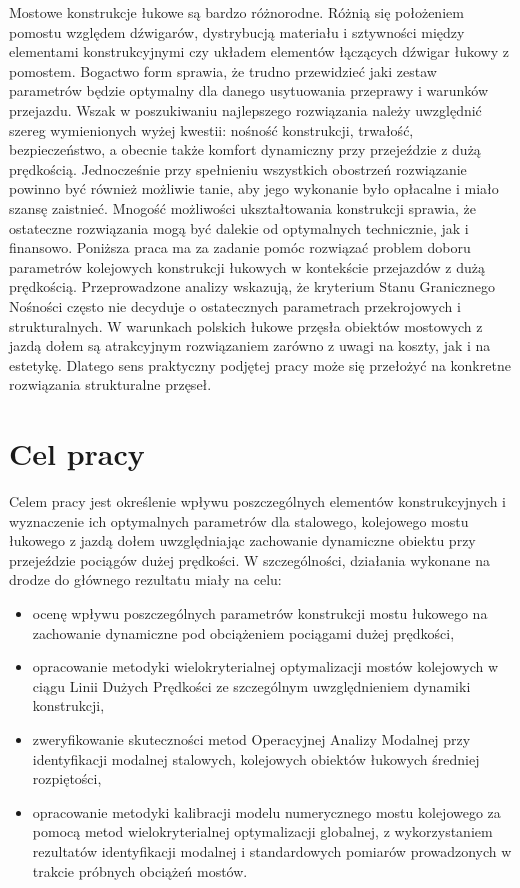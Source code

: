 Mostowe konstrukcje łukowe są bardzo różnorodne. Różnią się położeniem pomostu względem dźwigarów, dystrybucją materiału i sztywności między elementami konstrukcyjnymi czy układem elementów łączących dźwigar łukowy z pomostem. Bogactwo form sprawia, że trudno przewidzieć jaki zestaw parametrów będzie optymalny dla danego usytuowania przeprawy i warunków przejazdu. Wszak w poszukiwaniu najlepszego rozwiązania należy uwzględnić szereg wymienionych wyżej kwestii: nośność konstrukcji, trwałość, bezpieczeństwo, a obecnie także komfort dynamiczny przy przejeździe z dużą prędkością. Jednocześnie przy spełnieniu wszystkich obostrzeń rozwiązanie powinno być również możliwie tanie, aby jego wykonanie było opłacalne i miało szansę zaistnieć. Mnogość możliwości ukształtowania konstrukcji sprawia, że ostateczne rozwiązania mogą być dalekie od optymalnych technicznie, jak i finansowo. Poniższa praca ma za zadanie pomóc rozwiązać problem doboru parametrów kolejowych konstrukcji łukowych w kontekście przejazdów z dużą prędkością. Przeprowadzone analizy wskazują, że kryterium Stanu Granicznego Nośności często nie decyduje o ostatecznych parametrach przekrojowych i strukturalnych. W warunkach polskich łukowe przęsła obiektów mostowych z jazdą dołem są atrakcyjnym rozwiązaniem zarówno z uwagi na koszty, jak i na estetykę. Dlatego sens praktyczny podjętej pracy może się przełożyć na konkretne rozwiązania strukturalne przęseł.


\section*{Cel pracy}
Celem pracy jest określenie wpływu poszczególnych elementów konstrukcyjnych i wyznaczenie ich optymalnych parametrów dla stalowego, kolejowego mostu łukowego z jazdą dołem uwzględniając zachowanie dynamiczne obiektu przy przejeździe pociągów dużej prędkości.
W szczególności, działania wykonane na drodze do głównego rezultatu miały na celu:
\begin{itemize}
	\item ocenę wpływu poszczególnych parametrów konstrukcji mostu łukowego na zachowanie dynamiczne pod obciążeniem pociągami dużej prędkości,
	\item opracowanie metodyki wielokryterialnej optymalizacji mostów kolejowych w ciągu Linii Dużych Prędkości ze szczególnym uwzględnieniem dynamiki konstrukcji,
	\item zweryfikowanie skuteczności metod Operacyjnej Analizy Modalnej przy identyfikacji modalnej stalowych, kolejowych obiektów łukowych średniej rozpiętości,
	\item opracowanie metodyki kalibracji modelu numerycznego mostu kolejowego za pomocą metod wielokryterialnej optymalizacji globalnej, z wykorzystaniem rezultatów identyfikacji modalnej i standardowych pomiarów prowadzonych w trakcie próbnych obciążeń mostów.


\end{itemize}


